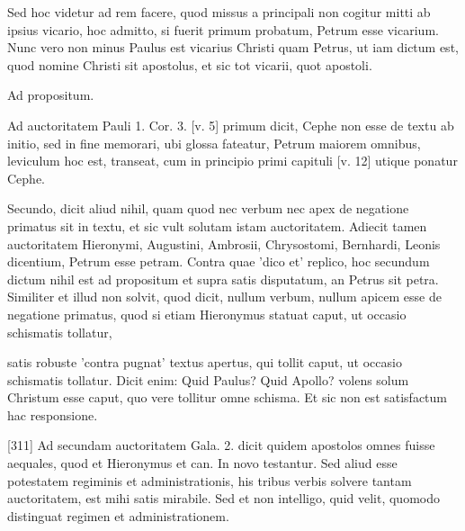 Sed hoc videtur ad rem facere, quod missus a principali non cogitur mitti ab ipsius vicario, hoc admitto, si fuerit primum probatum, Petrum esse vicarium. Nunc vero non minus Paulus est vicarius Christi quam Petrus, ut iam dictum est, quod nomine Christi sit apostolus, et sic tot vicarii, quot apostoli.

Ad propositum.

Ad auctoritatem Pauli 1. Cor. 3. [v. 5] primum dicit, Cephe non esse de textu ab initio, sed in fine memorari, ubi glossa fateatur, Petrum maiorem omnibus, leviculum hoc est, transeat, cum in principio primi capituli [v. 12] utique ponatur Cephe.

Secundo, dicit aliud nihil, quam quod nec verbum nec apex de negatione primatus sit in textu, et sic vult solutam istam auctoritatem. Adiecit tamen auctoritatem Hieronymi, Augustini, Ambrosii, Chrysostomi, Bernhardi, Leonis dicentium, Petrum esse petram. Contra quae 'dico et' replico, hoc secundum dictum nihil est ad propositum et supra satis disputatum, an Petrus sit petra. Similiter et illud non solvit, quod dicit, nullum verbum, nullum apicem esse de negatione primatus, quod si etiam Hieronymus statuat caput, ut occasio schismatis tollatur,

satis robuste 'contra pugnat' textus apertus, qui tollit caput, ut occasio schismatis tollatur. Dicit enim: Quid Paulus? Quid Apollo? volens solum Christum esse caput, quo vere tollitur omne schisma. Et sic non est satisfactum hac responsione.

[311] Ad secundam auctoritatem Gala. 2. dicit quidem apostolos omnes fuisse aequales, quod et Hieronymus et can. In novo testantur. Sed aliud esse potestatem regiminis et administrationis, his tribus verbis solvere tantam auctoritatem, est mihi satis mirabile. Sed et non intelligo, quid velit, quomodo distinguat regimen et administrationem.

